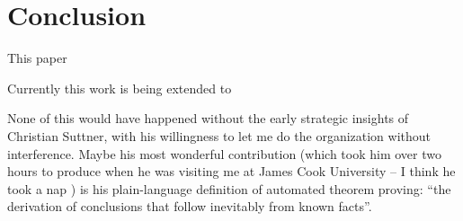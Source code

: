 \documentclass{easychair}
\begin{document}
\section{Conclusion}
\label{Conclusion}

This paper 

Currently this work is being extended to 

None of this would have happened without the early strategic insights of Christian Suttner,
with his willingness to let me do the organization without interference. 
Maybe his most wonderful contribution (which took him over two hours to produce when he
was visiting me at James Cook University -- I think he took a nap \smiley) is his 
plain-language definition of automated theorem proving: 
``the derivation of conclusions that follow inevitably from known facts''.



\end{document}
